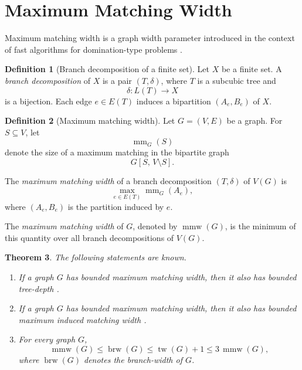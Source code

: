 \documentclass[10pt]{book}
\newtheorem{theorem}{Theorem}[section]
\theoremstyle{definition}
\newtheorem{definition}[theorem]{Definition}
\begin{document}
\section{Maximum Matching Width}

Maximum matching width is a graph width parameter introduced in the context of fast algorithms for domination-type problems \cite{153}.

\begin{definition}[Branch decomposition of a finite set]
Let \(X\) be a finite set.  
A \emph{branch decomposition} of \(X\) is a pair \((T,\delta)\), where \(T\) is a subcubic tree and
\[
\delta:L(T)\to X
\]
is a bijection.
Each edge \(e\in E(T)\) induces a bipartition \((A_e,B_e)\) of \(X\).
\end{definition}

\begin{definition}[Maximum matching width]
\cite{153}
Let \(G=(V,E)\) be a graph.  
For \(S\subseteq V\), let
\[
\operatorname{mm}_G(S)
\]
denote the size of a maximum matching in the bipartite graph
\[
G[S,\,V\setminus S].
\]

The \emph{maximum matching width} of a branch decomposition \((T,\delta)\) of \(V(G)\) is
\[
\max_{e\in E(T)} \operatorname{mm}_G(A_e),
\]
where \((A_e,B_e)\) is the partition induced by \(e\).

The \emph{maximum matching width} of \(G\), denoted by \(\operatorname{mmw}(G)\), is the minimum of this quantity over all branch decompositions of \(V(G)\).
\end{definition}

\begin{theorem}
The following statements are known.
\begin{enumerate}
    \item If a graph \(G\) has bounded maximum matching width, then it also has bounded tree-depth \cite{311}.

    \item If a graph \(G\) has bounded maximum matching width, then it also has bounded maximum induced matching width \cite{311}.

    \item For every graph \(G\),
    \[
    \operatorname{mmw}(G)\leq \operatorname{brw}(G)\leq \operatorname{tw}(G)+1\leq 3\,\operatorname{mmw}(G),
    \]
    where \(\operatorname{brw}(G)\) denotes the branch-width of \(G\).
\end{enumerate}
\end{theorem}
\end{document}
